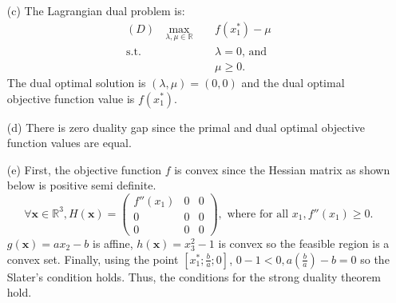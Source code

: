 \documentclass{article}
\begin{document}
\begin{itemize}
\item[(c)] The Lagrangian dual problem is:
\begin{align*}
(D) \ \ \ \max_{\lambda,\mu\in\mathbb{R}} \ \ \ \ & f(x_1^*) - \mu\\
    \text{s.t. } \ \ \ & \lambda=0 \text{, and}\\&
    \mu\geq0.
\end{align*}
The dual optimal solution is $\left(\lambda,\mu\right)= (0,0)$ and the dual optimal objective function value is $f(x_1^*)$.
\item[(d)] There is zero duality gap since the primal and dual optimal objective function values are equal.
\item[(e)] First, the objective function $f$ is convex since the Hessian matrix as shown below is positive semi definite. \[\forall \mathbf{x}\in\mathbb{R}^3, H(\mathbf{x}) = \begin{pmatrix}f''(x_1)&0&0\\0&0&0\\0&0&0\end{pmatrix}, \text{ where for all }x_1,  f''(x_1)\geq0. \] $g(\mathbf{x}) = ax_2-b$ is affine, $h(\mathbf{x}) = x_3^2-1$ is convex so the feasible region is a convex set. Finally, using the point $\left[x_1^*;\frac{b}{a};0\right]$, $0-1<0, a\left(\frac ba \right)-b=0$ so the Slater's condition holds. Thus, the conditions for the strong duality theorem hold. 
\end{itemize}
\end{document}
